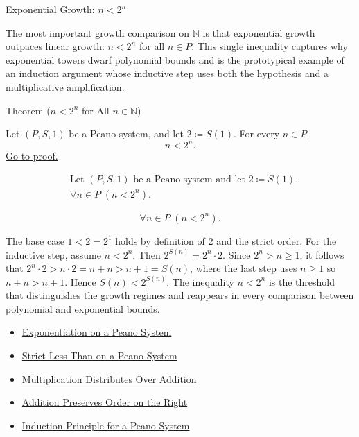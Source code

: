 \begin{topicbox}{Exponential Growth: $n < 2^n$}
\begin{exposition}
The most important growth comparison on $\mathbb{N}$ is that exponential
growth outpaces linear growth: $n < 2^n$ for all $n \in P$. This single
inequality captures why exponential towers dwarf polynomial bounds and is
the prototypical example of an induction argument whose inductive step uses
both the hypothesis and a multiplicative amplification.
\end{exposition}

\begin{theorembox}{Theorem ($n < 2^n$ for All $n \in \mathbb{N}$)}
\begin{theorem}
\label{thm:n-less-than-2-to-n}
Let $(P,S,1)$ be a Peano system, and let $2 \coloneqq S(1)$. For every $n \in P$,
\[
n < 2^n.
\]
\hyperref[prf:n-less-than-2-to-n]{Go to proof.}
\end{theorem}
\end{theorembox}

\begin{remark*}
\[
\begin{aligned}
&\text{Let } (P,S,1) \text{ be a Peano system and let } 2 \coloneqq S(1).\\
&\forall n \in P\;(n < 2^n).
\end{aligned}
\]
\end{remark*}

\begin{remark*}
\[
\forall n \in P\;(n < 2^n).
\]
\end{remark*}

\begin{remark*}[Interpretation]
The base case $1 < 2 = 2^1$ holds by definition of $2$ and the strict order.
For the inductive step, assume $n < 2^n$. Then $2^{S(n)} = 2^n \cdot 2$.
Since $2^n > n \ge 1$, it follows that
$2^n \cdot 2 > n \cdot 2 = n + n > n + 1 = S(n)$,
where the last step uses $n \ge 1$ so $n + n > n + 1$. Hence $S(n) < 2^{S(n)}$.
The inequality $n < 2^n$ is the threshold that distinguishes the growth regimes
and reappears in every comparison between polynomial and exponential bounds.
\end{remark*}

\begin{dependencies}
\begin{itemize}
  \item \hyperref[def:exponentiation-on-peano-system]{Exponentiation on a Peano System}
  \item \hyperref[def:strict-less-than-on-peano-system]{Strict Less Than on a Peano System}
  \item \hyperref[thm:multiplication-distributes-over-addition]{Multiplication Distributes Over Addition}
  \item \hyperref[thm:addition-preserves-order-on-right]{Addition Preserves Order on the Right}
  \item \hyperref[thm:induction-principle-for-peano-system]{Induction Principle for a Peano System}
\end{itemize}
\end{dependencies}
\end{topicbox}

